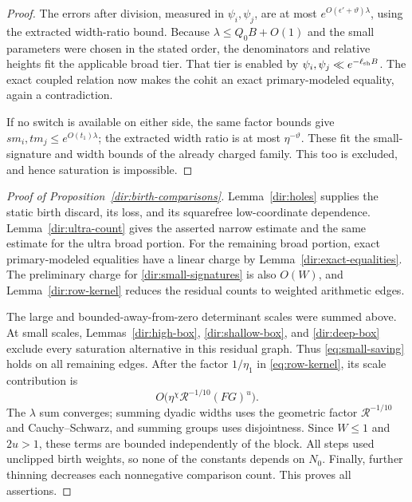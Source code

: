 \begin{proof}
The errors after division, measured in $\psi_i,\psi_j$, are at
most $e^{O(\epsilon'+\vartheta)\lambda}$, using the extracted
width-ratio bound. Because $\lambda\le Q_0B+O(1)$ and the small
parameters were chosen in the stated order, the denominators and
relative heights fit the applicable broad tier. That tier is
enabled by $\psi_i,\psi_j\ll e^{-\ell_{\rm sh}B}$.
The exact coupled relation now makes the cohit an exact
primary-modeled equality, again a contradiction.

If no switch is available on either side, the same factor bounds
give $s m_i,t m_j\le e^{O(t_1)\lambda}$; the extracted width ratio
is at most $\eta^{-\vartheta}$. These fit the small-signature and
width bounds of the already charged family. This too is excluded,
and hence saturation is impossible.
\end{proof}

\begin{proof}[Proof of Proposition~\ref{dir:birth-comparisons}]
Lemma~\ref{dir:holes} supplies the static birth discard, its loss,
and its squarefree low-coordinate dependence.
Lemma~\ref{dir:ultra-count} gives the asserted narrow estimate and
the same estimate for the ultra broad portion. For the remaining
broad portion, exact primary-modeled equalities have a linear
charge by Lemma~\ref{dir:exact-equalities}. The preliminary charge
for \eqref{dir:small-signatures} is also $O(W)$, and
Lemma~\ref{dir:row-kernel} reduces the residual counts to weighted
arithmetic edges.

The large and bounded-away-from-zero determinant scales were summed
above. At small scales, Lemmas~\ref{dir:high-box},
\ref{dir:shallow-box}, and \ref{dir:deep-box} exclude every
saturation alternative in this residual graph. Thus
\eqref{eq:small-saving} holds on all remaining edges. After the
factor $1/\eta_1$ in \eqref{eq:row-kernel}, its scale contribution
is
\[
 O\bigl(\eta^\chi\mathcal R^{-1/10}(FG)^u\bigr).
\]
The $\lambda$ sum converges; summing dyadic widths uses the
geometric factor $\mathcal R^{-1/10}$ and Cauchy--Schwarz, and
summing groups uses disjointness. Since $W\le1$ and $2u>1$, these
terms are bounded independently of the block. All steps used
unclipped birth weights, so none of the constants depends on
$N_0$. Finally, further thinning decreases each nonnegative
comparison count. This proves all assertions.
\end{proof}
